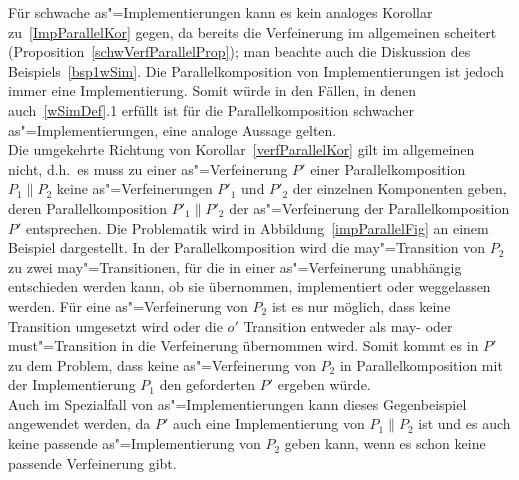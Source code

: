 Für schwache as"=Implementierungen kann es kein analoges Korollar
zu~\ref{ImpParallelKor} gegen, da bereits die Verfeinerung im allgemeinen
scheitert (Proposition~\ref{schwVerfParallelProp}); man beachte auch die
Diskussion des Beispiels~\ref{bsp1wSim}. Die Parallelkomposition von
Implementierungen ist jedoch immer eine Implementierung. Somit würde in den
Fällen, in denen auch~\ref{wSimDef}.1 erfüllt ist für die Parallelkomposition
schwacher as"=Implementierungen, eine analoge Aussage gelten.\\
Die umgekehrte Richtung von Korollar~\ref{verfParallelKor} gilt im
allgemeinen nicht, d.h.\ es muss zu einer as"=Verfeinerung $P'$ einer
Parallelkomposition $P_1\|P_2$ keine as"=Verfeinerungen $P'_1$ und $P'_2$ der
einzelnen Komponenten geben, deren Parallelkomposition $P'_1\|P'_2$ der
as"=Verfeinerung der Parallelkomposition $P'$ entsprechen. Die Problematik wird
in Abbildung~\ref{impParallelFig} an einem Beispiel dargestellt. In der
Parallelkomposition wird die may"=Transition von $P_2$ zu zwei
may"=Transitionen, für die in einer as"=Verfeinerung unabhängig entschieden
werden kann, ob sie übernommen, implementiert oder weggelassen werden. Für eine
as"=Verfeinerung von $P_2$ ist es nur möglich, dass keine Transition umgesetzt
wird oder die $o'$ Transition entweder als may- oder must"=Transition in die
Verfeinerung übernommen wird. Somit kommt es in $P'$ zu dem Problem, dass keine
as"=Verfeinerung von $P_2$ in Parallelkomposition mit der Implementierung
$P_1$ den geforderten \MEIO{} $P'$ ergeben würde.\\
Auch im Spezialfall von as"=Implementierungen kann dieses Gegenbeispiel
angewendet werden, da $P'$ auch eine Implementierung von $P_1\|P_2$ ist und es
auch keine passende as"=Implementierung von $P_2$ geben kann, wenn es schon
keine passende Verfeinerung gibt.


